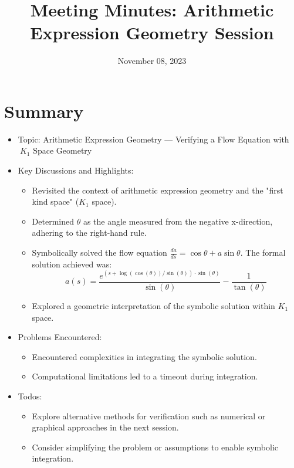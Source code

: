 \documentclass{article}
\title{Meeting Minutes: Arithmetic Expression Geometry Session}
\date{November 08, 2023}
\begin{document}
\maketitle

\section*{Summary}
\begin{itemize}
    \item Topic: Arithmetic Expression Geometry — Verifying a Flow Equation with \(\ K_1 \) Space Geometry
    \item Key Discussions and Highlights:
    \begin{itemize}
        \item Revisited the context of arithmetic expression geometry and the "first kind space" (\(K_1\) space).
        \item Determined \(\theta\) as the angle measured from the negative x-direction, adhering to the right-hand rule.
        \item Symbolically solved the flow equation \(\frac{da}{ds} = \cos \theta + a \sin \theta\). The formal solution achieved was:
        \[
            a(s) = \frac{e^{(s + \log(\cos(\theta))/\sin(\theta)) \cdot \sin(\theta)}}{\sin(\theta)} - \frac{1}{\tan(\theta)}
        \]
        \item Explored a geometric interpretation of the symbolic solution within \(K_1\) space.
    \end{itemize}
    \item Problems Encountered:
    \begin{itemize}
        \item Encountered complexities in integrating the symbolic solution.
        \item Computational limitations led to a timeout during integration.
    \end{itemize}
    \item Todos:
    \begin{itemize}
        \item Explore alternative methods for verification such as numerical or graphical approaches in the next session.
        \item Consider simplifying the problem or assumptions to enable symbolic integration.
    \end{itemize}
\end{itemize}
\end{document}
